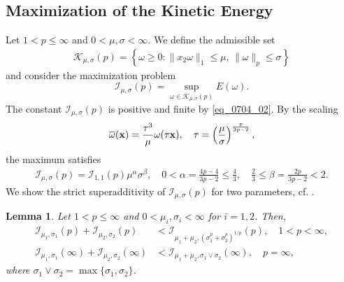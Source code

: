 \documentclass[11pt]{amsart}
\newtheorem{lemma}[theorem]{Lemma}
\theoremstyle{definition}
\theoremstyle{definition}
\numberwithin{equation}{section}
\newcommand{\0}{\emptyset}
\newcommand{\bfx}{{\bf x}}
\newcommand{\calI}{\mathcal I}
\newcommand{\calK}{\mathcal K}
\begin{document}
	
	
	\subsection{Maximization of the  Kinetic Energy}
	
	Let $1<p\leq \infty$ and $0 < \mu, \sigma < \infty$. We define the admissible set 
	\begin{equation}
		\begin{aligned}
			\calK_{\mu, \sigma}(p)   = 
			\left\{ \omega \ge 0: \|x_2\omega\|_1 \le \mu, \,   \|\omega\|_p \le \sigma \right\}	
		\end{aligned}
		\label{eq: AS}
	\end{equation}
	and consider the maximization problem
	\begin{equation}\label{eq_maximization}
		\calI_{\mu, \sigma}(p)= \sup_{\omega \in \calK_{\mu, \sigma}(p)} E(\omega).    
	\end{equation}
	The constant $\calI_{\mu, \sigma}(p)$ is positive and finite by \eqref{eq_0704_02}.
	By the scaling 
	\begin{equation}\label{two_scaling}
		\overline{\omega}(\bfx) = \frac{\tau^3}{\mu} \omega(\tau \bfx),\quad \tau=\left(\frac{\mu}{\sigma}\right)^{\frac{p}{3p-2}},
	\end{equation}
	the maximum satisfies 
	\begin{align}
		{\calI}_{\mu,\sigma}(p)=\calI_{1,1}(p)\mu^{\alpha}\sigma^{\beta},\quad 0< \alpha=\frac{4p-4}{3p-2}\leq \frac{4}{3},\quad \frac{2}{3}\leq \beta=\frac{2p}{3p-2}<2.  \label{eq: scaling}
	\end{align}
	We show the strict superadditivity of $\calI_{\mu,\sigma}(p)$ for two parameters, cf. \cite[IV]{Lions84b}.
	
	\begin{lemma}\label{lem_superadd}
		Let $1<p\leq \infty$ and $0<\mu_i,\sigma_i<\infty$ for $i=1,2$. Then, 
		\begin{equation}
			\begin{aligned}
				\calI_{\mu_1,\sigma_1}(p)+\calI_{\mu_2,\sigma_2}(p)&<\calI_{\mu_1+\mu_2,(\sigma_1^{p}+\sigma_2^{p})^{1/p} }(p),\quad 1<p<\infty,    \\
				\calI_{\mu_1,\sigma_1}(\infty)+\calI_{\mu_2,\sigma_2}(\infty)&<\calI_{\mu_1+\mu_2,\sigma_1\vee \sigma_2 }(\infty),\quad p=\infty,
			\end{aligned}
			\label{eq: SSA}
		\end{equation}
		where $\sigma_1 \vee \sigma_2 = \max \{ \sigma_1, \sigma_2\}$.
	\end{lemma}
	
\end{document}
